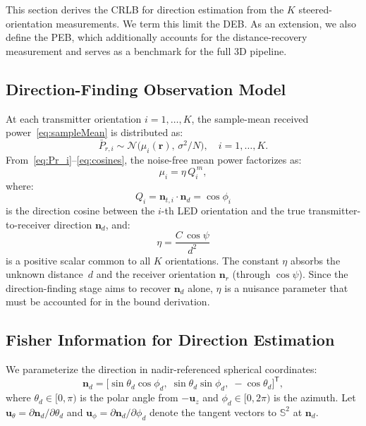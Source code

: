 \documentclass[journal]{IEEEtran}
\begin{document}
This section derives the CRLB for direction estimation from the $K$ steered-orientation measurements. We term this limit the DEB. As an extension, we also define the PEB, which additionally accounts for the distance-recovery measurement and serves as a benchmark for the full 3D pipeline.

\subsection{Direction-Finding Observation Model}
At each transmitter orientation $i=1,\ldots,K$, the sample-mean received power~\eqref{eq:sampleMean} is distributed as:
\begin{equation}
\bar P_{r,i} \sim 
  \mathcal{N}\!\bigl(\mu_{i}(\mathbf r),\,\sigma^{2}/N\bigr),
\quad i=1,\dots,K.
\end{equation}
From~\eqref{eq:Pr_i}--\eqref{eq:cosines}, the noise-free mean power factorizes as:
\begin{equation}
\mu_i = \eta\,Q_i^{\,m},
\label{eq:mu_factorized}
\end{equation}
where:
\begin{equation}
Q_i = \mathbf{n}_{t,i}\cdot\mathbf{n}_d = \cos\phi_i
\label{eq:Q}
\end{equation}
is the direction cosine between the $i$-th LED orientation and the true transmitter-to-receiver direction $\mathbf{n}_d$, and:
\begin{equation}
\eta = \frac{C\,\cos\psi}{d^2}
\label{eq:eta_nuisance}
\end{equation}
is a positive scalar common to all $K$ orientations.  The constant $\eta$ absorbs the unknown distance~$d$ and the receiver orientation $\mathbf{n}_r$ (through $\cos\psi$).  Since the direction-finding stage aims to recover $\mathbf{n}_d$ alone, $\eta$ is a nuisance parameter that must be accounted for in the bound derivation.

\subsection{Fisher Information for Direction Estimation}
\label{subsec:FIM}
We parameterize the direction in nadir-referenced spherical coordinates:
\begin{equation}
\mathbf{n}_d = \bigl[\sin\theta_d\cos\phi_d,\;\sin\theta_d\sin\phi_d,\;-\cos\theta_d\bigr]^{\mathsf T},
\label{eq:nd_spherical}
\end{equation}
where $\theta_d\in[0,\pi)$ is the polar angle from $-\mathbf{u}_z$ and $\phi_d\in[0,2\pi)$ is the azimuth.  Let $\mathbf{u}_\theta = \partial\mathbf{n}_d/\partial\theta_d$ and $\mathbf{u}_\phi = \partial\mathbf{n}_d/\partial\phi_d$ denote the tangent vectors to $\mathbb{S}^2$ at $\mathbf{n}_d$.
\end{document}
